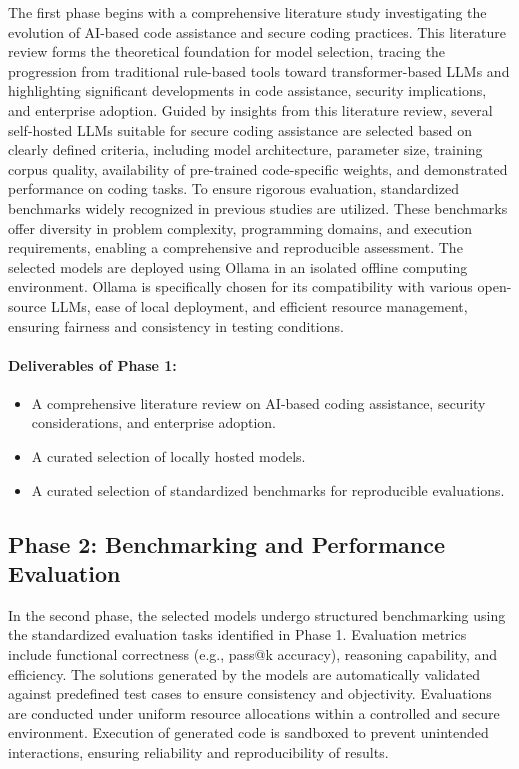 The first phase begins with a comprehensive literature study investigating the evolution of AI-based code assistance and secure coding practices. This literature review forms the theoretical foundation for model selection, tracing the progression from traditional rule-based tools toward transformer-based LLMs and highlighting significant developments in code assistance, security implications, and enterprise adoption.
Guided by insights from this literature review, several self-hosted LLMs suitable for secure coding assistance are selected based on clearly defined criteria, including model architecture, parameter size, training corpus quality, availability of pre-trained code-specific weights, and demonstrated performance on coding tasks.
To ensure rigorous evaluation, standardized benchmarks widely recognized in previous studies are utilized. These benchmarks offer diversity in problem complexity, programming domains, and execution requirements, enabling a comprehensive and reproducible assessment.
The selected models are deployed using Ollama in an isolated offline computing environment. Ollama is specifically chosen for its compatibility with various open-source LLMs, ease of local deployment, and efficient resource management, ensuring fairness and consistency in testing conditions.

\paragraph{Deliverables of Phase 1:}
\begin{itemize}
	\item A comprehensive literature review on AI-based coding assistance, security considerations, and enterprise adoption.
	\item A curated selection of locally hosted models.
	\item A curated selection of standardized benchmarks for reproducible evaluations.
\end{itemize}

\subsection{Phase 2: Benchmarking and Performance Evaluation}

In the second phase, the selected models undergo structured benchmarking using the standardized evaluation tasks identified in Phase 1. Evaluation metrics include functional correctness (e.g., pass@k accuracy), reasoning capability, and efficiency. The solutions generated by the models are automatically validated against predefined test cases to ensure consistency and objectivity.
Evaluations are conducted under uniform resource allocations within a controlled and secure environment. Execution of generated code is sandboxed to prevent unintended interactions, ensuring reliability and reproducibility of results.

